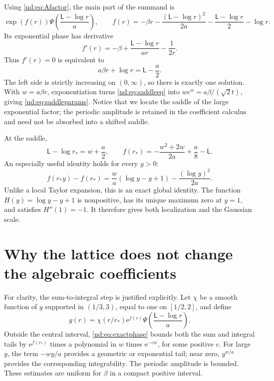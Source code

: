 \documentclass[11pt,a4paper,oneside,openany]{book}
\numberwithin{equation}{chapter}
\theoremstyle{definition}
\theoremstyle{remark}
\newcommand{\e}{\mathrm e}
\newcommand{\Lsad}{\mathsf L}
\begin{document}
Using \eqref{nd:eq:Afactor}, the main part of the summand is
\begin{equation}
 \exp(f(r))\Psi\left(\frac{\Lsad-\log r}{a}\right),
 \qquad
 f(r)=-\beta r-\frac{(\Lsad-\log r)^2}{2a}
                   -\frac{\Lsad-\log r}{2}-\log r.
 \label{nd:eq:phasef}
\end{equation}
Its exponential phase has derivative
\[
 f'(r)=-\beta+\frac{\Lsad-\log r}{ar}-\frac1{2r}.
\]
Thus \(f'(r)=0\) is equivalent to
\begin{equation}
 a\beta r+\log r=\Lsad-\frac a2.
 \label{nd:eq:saddleeq}
\end{equation}
The left side is strictly increasing on \((0,\infty)\), so there is exactly
one solution. With \(w=a\beta r\), exponentiation turns
\eqref{nd:eq:saddleeq} into \(we^w=a\beta/(\sqrt2t)\), giving
\eqref{nd:eq:saddleparams}. Notice that we locate the saddle of the large
exponential factor; the periodic amplitude is retained in the coefficient
calculus and need not be absorbed into a shifted saddle.

At the saddle,
\begin{equation}
 \Lsad-\log r_*=w+\frac a2,\qquad
 f(r_*)=-\frac{w^2+2w}{2a}+\frac a8-\Lsad.
 \label{nd:eq:fstar}
\end{equation}
An especially useful identity holds for every \(y>0\):
\begin{equation}
 f(r_*y)-f(r_*)=
        \frac wa(\log y-y+1)-\frac{(\log y)^2}{2a}.
 \label{nd:eq:exactphase}
\end{equation}
Unlike a local Taylor expansion, this is an exact global identity. The function
\(H(y)=\log y-y+1\) is nonpositive, has its unique maximum zero at \(y=1\),
and satisfies \(H''(1)=-1\). It therefore gives both localization and the
Gaussian scale.

\section{Why the lattice does not change the algebraic coefficients}
For clarity, the sum-to-integral step is justified explicitly. Let \(\chi\)
be a smooth function of \(y\) supported in \((1/3,3)\), equal to one on
\([1/2,2]\), and define
\[
 g(r)=\chi(r/r_*)\e^{f(r)}
                   \Psi\left(\frac{\Lsad-\log r}{a}\right).
\]
Outside the central interval, \eqref{nd:eq:exactphase} bounds both the sum and
integral tails by \(\e^{f(r_*)}\) times a polynomial in \(w\) times
\(\e^{-cw}\), for some positive \(c\). For large \(y\), the term
\(-wy/a\) provides a geometric or exponential tail; near zero,
\(y^{w/a}\) provides the corresponding integrability. The periodic amplitude
is bounded. These estimates are uniform for \(\beta\) in a compact positive
interval.
\end{document}

